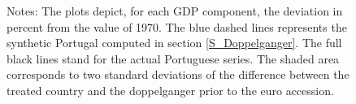 \documentclass[12pt]{article}
\newcommand{\annote}[1]{\parbox{\textwidth}{\renewcommand{\baselinestretch}{1.0}\vspace{12pt} \small Notes: #1}}
\begin{document}
\begin{figure}[h!]
    \annote{The plots depict, for each GDP component, the deviation in percent from the value of 1970. The blue dashed lines represents the synthetic Portugal computed in section \ref{S_Doppelganger}. The full black lines stand for the actual Portuguese series.  The shaded area corresponds to two standard deviations of the difference between the treated country and the doppelganger prior to the euro accession.}
\end{figure}
\end{document}
